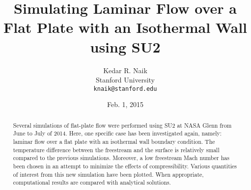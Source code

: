 \documentclass[12pt,letterpaper]{article}
\begin{document}
\title{Simulating Laminar Flow over a Flat Plate with an Isothermal Wall using SU2}
\author{Kedar R. Naik \\
 Stanford University \\
 \texttt{knaik@stanford.edu}}
\date{Feb. 1, 2015}
\maketitle

\begin{abstract}
Several simulations of flat-plate flow were performed using SU2 at NASA Glenn from June to July of 2014. Here, one specific case has been investigated again, namely: laminar flow over a flat plate with an isothermal wall boundary condition. The temperature difference between the freestream and the surface is relatively small compared to the previous simulations. Moreover, a low freestream Mach number has been chosen in an attempt to minimize the effects of compressibility. Various quantities of interest from this new simulation have been plotted. When appropriate, computational results are compared with analytical solutions.
\end{abstract}
\end{document}
